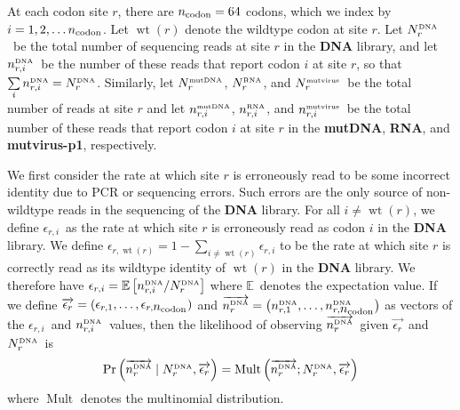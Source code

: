\documentclass[12pt,draft]{article}
\DeclareMathOperator{\multinomial}{Mult}
\DeclareMathOperator{\wt}{wt}
\newcommand{\ncodon}{\mbox{$n_{\rm{codon}}$}}
\newcommand{\Nrdna}{\mbox{$N_r^{\rm \scriptscriptstyle DNA}$}}
\newcommand{\Nrmutdna}{\mbox{$N_r^{\rm \scriptscriptstyle mut DNA}$}}
\newcommand{\Nrrna}{\mbox{$N_r^{\rm \scriptscriptstyle RNA}$}}
\newcommand{\Nrmutvirus}{\mbox{$N_r^{\rm \scriptscriptstyle mut virus}$}}
\newcommand{\nrdnai}{\mbox{$n_{r, i}^{\rm \scriptscriptstyle DNA}$}}
\newcommand{\nrdnaone}{\mbox{$n_{r, 1}^{\rm \scriptscriptstyle DNA}$}}
\newcommand{\nrdnancodon}{\mbox{$n_{r, \ncodon}^{\rm \scriptscriptstyle DNA}$}}
\newcommand{\nrmutdnai}{\mbox{$n_{r, i}^{\rm \scriptscriptstyle mut DNA}$}}
\newcommand{\nrrnai}{\mbox{$n_{r, i}^{\rm \scriptscriptstyle  RNA}$}}
\newcommand{\nrmutvirusi}{\mbox{$n_{r, i}^{\rm \scriptscriptstyle mut virus}$}}
\newcommand{\nrdnavec}{\mbox{$\overrightarrow{n_{r}^{\rm \scriptscriptstyle DNA}}$}}
\newcommand{\eri}{\mbox{$\epsilon_{r,i}$}}
\newcommand{\erwtr}{\mbox{$\epsilon_{r,\wt\left(r\right)}$}}
\newcommand{\ervec}{\mbox{$\overrightarrow{\epsilon_{r}}$}}
\newcommand{\E}{\mbox{$\mathbb{E}$}}
\begin{document}
At each codon site $r$, there are $\ncodon = 64$ codons, which we index by $i = 1, 2,  \ldots \ncodon$. Let $\wt\left(r\right)$ denote the wildtype codon at site $r$. Let \Nrdna\ be the total number of sequencing reads at site $r$ in the {\bf DNA} library, and let \nrdnai\ be the number of these reads that report codon $i$ at site $r$, so that $\sum\limits_{i} \nrdnai = \Nrdna$. Similarly, let \Nrmutdna, \Nrrna, and \Nrmutvirus\ be the total number of reads at site $r$ and let \nrmutdnai, \nrrnai, and \nrmutvirusi\ be the total number of these reads that report codon $i$ at site $r$ in the {\bf mutDNA}, {\bf RNA}, and {\bf mutvirus-p1}, respectively. 

We first consider the rate at which site $r$ is erroneously read to be some incorrect identity due to PCR or sequencing errors. Such errors are the only source of non-wildtype reads in the sequencing of the {\bf DNA} library. For all $i \ne \wt\left(r\right)$, we define \eri\ as the rate at which site $r$ is erroneously read as codon $i$ in the {\bf DNA} library. We define $\erwtr = 1 - \sum\limits_{i \ne \wt\left(r\right)} \eri$ to be the rate at which site $r$ is correctly read as its wildtype identity of $\wt\left(r\right)$ in the {\bf DNA} library. We therefore have $\eri = \E\left[\nrdnai / \Nrdna\right]$ where \E\ denotes the expectation value. If we define $\ervec = \left(\epsilon_{r,1}, \ldots, \epsilon_{r,\ncodon}\right)$ and $\nrdnavec = \left(\nrdnaone, \ldots, \nrdnancodon \right)$ as vectors of the \eri\ and \nrdnai\ values, then the likelihood of observing \nrdnavec\ given \ervec\ and \Nrdna\ is
\begin{equation}
\label{eq:nrdnaveclikelihood}
\Pr\left(\nrdnavec \mid \Nrdna, \ervec\right) = \multinomial\left(\nrdnavec; \Nrdna, \ervec\right)
\end{equation}
where $\multinomial$ denotes the multinomial distribution.
\end{document}
